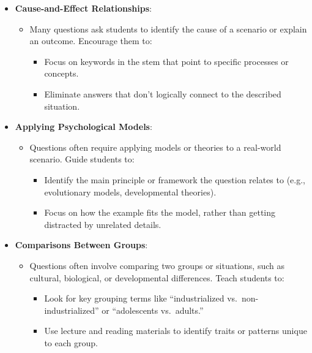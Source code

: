\documentclass[
]{article}
\providecommand{\tightlist}{%
  \setlength{\itemsep}{0pt}\setlength{\parskip}{0pt}}
\begin{document}
\begin{itemize}
\tightlist
\item
  \textbf{Cause-and-Effect Relationships}:

  \begin{itemize}
  \tightlist
  \item
    Many questions ask students to identify the cause of a scenario or explain an outcome. Encourage them to:

    \begin{itemize}
    \tightlist
    \item
      Focus on keywords in the stem that point to specific processes or concepts.
    \item
      Eliminate answers that don't logically connect to the described situation.
    \end{itemize}
  \end{itemize}
\item
  \textbf{Applying Psychological Models}:

  \begin{itemize}
  \tightlist
  \item
    Questions often require applying models or theories to a real-world scenario. Guide students to:

    \begin{itemize}
    \tightlist
    \item
      Identify the main principle or framework the question relates to (e.g., evolutionary models, developmental theories).
    \item
      Focus on how the example fits the model, rather than getting distracted by unrelated details.
    \end{itemize}
  \end{itemize}
\item
  \textbf{Comparisons Between Groups}:

  \begin{itemize}
  \tightlist
  \item
    Questions often involve comparing two groups or situations, such as cultural, biological, or developmental differences. Teach students to:

    \begin{itemize}
    \tightlist
    \item
      Look for key grouping terms like ``industrialized vs.~non-industrialized'' or ``adolescents vs.~adults.''
    \item
      Use lecture and reading materials to identify traits or patterns unique to each group.
    \end{itemize}
  \end{itemize}
\end{itemize}
\end{document}
